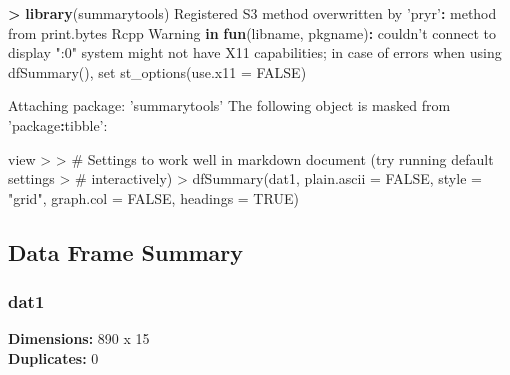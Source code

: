 \documentclass[
]{book}
\newenvironment{Shaded}{\begin{snugshade}}{\end{snugshade}}
\newcommand{\ControlFlowTok}[1]{\textcolor[rgb]{0.13,0.29,0.53}{\textbf{#1}}}
\newcommand{\KeywordTok}[1]{\textcolor[rgb]{0.13,0.29,0.53}{\textbf{#1}}}
\newcommand{\NormalTok}[1]{#1}
\newcommand{\OperatorTok}[1]{\textcolor[rgb]{0.81,0.36,0.00}{\textbf{#1}}}
\newcommand{\StringTok}[1]{\textcolor[rgb]{0.31,0.60,0.02}{#1}}
\begin{document}
\begin{Shaded}
\begin{Highlighting}[]
\OperatorTok{>}\StringTok{ }\KeywordTok{library}\NormalTok{(summarytools)}
\NormalTok{Registered S3 method overwritten by }\StringTok{'pryr'}\OperatorTok{:}
\StringTok{  }\NormalTok{method      from}
\NormalTok{  print.bytes Rcpp}
\NormalTok{Warning }\ControlFlowTok{in} \KeywordTok{fun}\NormalTok{(libname, pkgname)}\OperatorTok{:}\StringTok{ }\NormalTok{couldn}\StringTok{'t connect to display ":0"}
\StringTok{system might not have X11 capabilities; in case of errors when using dfSummary(), set st_options(use.x11 = FALSE)}

\StringTok{Attaching package: '}\NormalTok{summarytools}\StringTok{'}
\StringTok{The following object is masked from '}\NormalTok{package}\OperatorTok{:}\NormalTok{tibble}\StringTok{':}

\StringTok{    view}
\StringTok{> }
\StringTok{> # Settings to work well in markdown document (try running default settings}
\StringTok{> # interactively)}
\StringTok{> dfSummary(dat1, plain.ascii = FALSE, style = "grid", graph.col = FALSE, headings = TRUE)}
\end{Highlighting}
\end{Shaded}

\hypertarget{data-frame-summary}{%
\subsection{Data Frame Summary}\label{data-frame-summary}}

\hypertarget{dat1}{%
\subsubsection{dat1}\label{dat1}}

\textbf{Dimensions:} 890 x 15\\
\textbf{Duplicates:} 0
\end{document}
